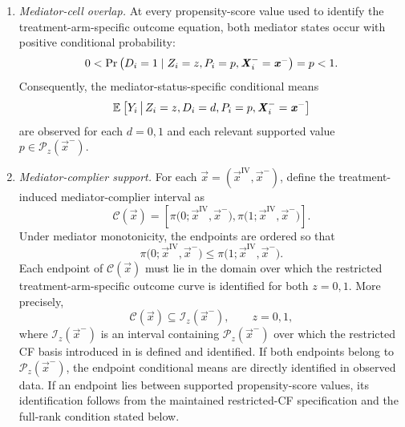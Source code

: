 \begin{enumerate}[label=\textbf{(\arabic*)}]
    \item \emph{Mediator-cell overlap.}
    At every propensity-score value used to identify the treatment-arm-specific outcome equation, both mediator states occur with positive conditional probability:
    \[
        0
        <
        \Pr\left( 
            D_i=1
            \mid
            Z_i=z,
            P_i=p,
            \boldsymbol{\mathit{X}}_i^-=\boldsymbol{\mathit{x}}^-
         \right)
        =
        p
        <
        1.
    \]
    Consequently, the mediator-status-specific conditional means
    \[
        \mathbb{E}_{} \left[ 
            Y_i
         \, \middle\vert \, 
            Z_i=z,
            D_i=d,
            P_i=p,
            \boldsymbol{\mathit{X}}_i^-=\boldsymbol{\mathit{x}}^-
         \right]
    \]
    are observed for each $d=0,1$ and each relevant supported value $p\in\mathcal P_z(\vec x^-)$.

    \item \emph{Mediator-complier support.}
    For each $\vec x=(\vec x^{\mathrm{IV}},\vec x^-)$, define the treatment-induced mediator-complier interval as
    \[
        \mathcal C(\vec x)
        =
        \left[
            \pi
            \big(
                0;
                \vec x^{\mathrm{IV}},
                \vec x^-
            \big),
            \pi
            \big(
                1;
                \vec x^{\mathrm{IV}},
                \vec x^-
            \big)
        \right].
    \]
    Under mediator monotonicity, the endpoints are ordered so that
    \[
        \pi
        \big(
            0;
            \vec x^{\mathrm{IV}},
            \vec x^-
        \big)
        \leq
        \pi
        \big(
            1;
            \vec x^{\mathrm{IV}},
            \vec x^-
        \big).
    \]
    Each endpoint of $\mathcal C(\vec x)$ must lie in the domain over which the restricted treatment-arm-specific outcome curve is identified for both $z=0,1$.
    More precisely,
    \[
        \mathcal C(\vec x)
        \subseteq
        \mathcal I_z(\vec x^-),
        \qquad
        z=0,1,
    \]
    where $\mathcal I_z(\vec x^-)$ is an interval containing $\mathcal P_z(\vec x^-)$ over which the restricted CF basis introduced in  is defined and identified.
    If both endpoints belong to $\mathcal P_z(\vec x^-)$, the endpoint conditional means are directly identified in observed data.
    If an endpoint lies between supported propensity-score values, its identification follows from the maintained restricted-CF specification and the full-rank condition stated below.

\end{enumerate}


